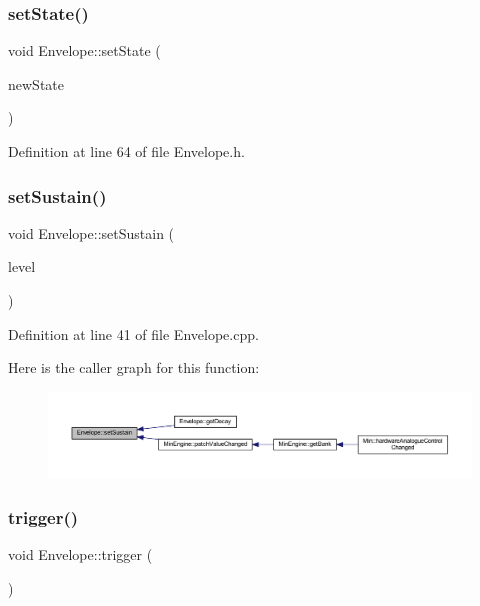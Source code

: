 \subsubsection{\texorpdfstring{set\+State()}{setState()}}
{\footnotesize\ttfamily void Envelope\+::set\+State (\begin{DoxyParamCaption}\item[{\hyperlink{class_envelope_a16c15d3d555a1a27869f48696f430d5f}{Env\+State}}]{new\+State }\end{DoxyParamCaption})\hspace{0.3cm}{\ttfamily [inline]}}



Definition at line 64 of file Envelope.\+h.

\mbox{\label{class_envelope_a18deee1d88842bfbbcfb2765eb944f4d}} 
\subsubsection{\texorpdfstring{set\+Sustain()}{setSustain()}}
{\footnotesize\ttfamily void Envelope\+::set\+Sustain (\begin{DoxyParamCaption}\item[{int}]{level }\end{DoxyParamCaption})}



Definition at line 41 of file Envelope.\+cpp.

Here is the caller graph for this function\+:
\nopagebreak
\begin{figure}[H]
\begin{center}
\leavevmode
\includegraphics[width=350pt]{d7/df3/class_envelope_a18deee1d88842bfbbcfb2765eb944f4d_icgraph}
\end{center}
\end{figure}
\mbox{\label{class_envelope_a03b0aeb7f8550ec701e3a07839ad47ec}} 
\subsubsection{\texorpdfstring{trigger()}{trigger()}}
{\footnotesize\ttfamily void Envelope\+::trigger (\begin{DoxyParamCaption}{ }\end{DoxyParamCaption})}



